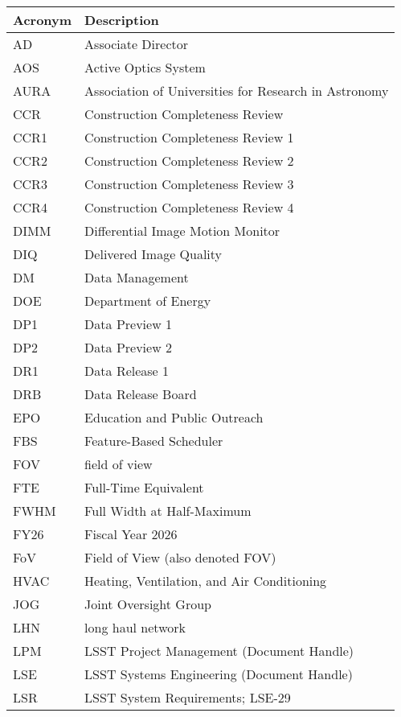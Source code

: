 \addtocounter{table}{-1}
\begin{longtable}{p{}p{}}\hline
\textbf{Acronym} & \textbf{Description}  \\\hline

AD & Associate Director \\\hline
AOS & Active Optics System \\\hline
AURA & Association of Universities for Research in Astronomy \\\hline
CCR & Construction Completeness Review \\\hline
CCR1 & Construction Completeness Review 1 \\\hline
CCR2 & Construction Completeness Review 2 \\\hline
CCR3 & Construction Completeness Review 3 \\\hline
CCR4 & Construction Completeness Review 4 \\\hline
DIMM & Differential Image Motion Monitor \\\hline
DIQ & Delivered Image Quality \\\hline
DM & Data Management \\\hline
DOE & Department of Energy \\\hline
DP1 & Data Preview 1 \\\hline
DP2 & Data Preview 2 \\\hline
DR1 & Data Release 1 \\\hline
DRB & Data Release Board \\\hline
EPO & Education and Public Outreach \\\hline
FBS & Feature-Based Scheduler \\\hline
FOV & field of view \\\hline
FTE & Full-Time Equivalent \\\hline
FWHM & Full Width at Half-Maximum \\\hline
FY26 & Fiscal Year 2026 \\\hline
FoV & Field of View (also denoted FOV) \\\hline
HVAC & Heating, Ventilation, and Air Conditioning \\\hline
JOG & Joint Oversight Group \\\hline
LHN & long haul network \\\hline
LPM & LSST Project Management (Document Handle) \\\hline
LSE & LSST Systems Engineering (Document Handle) \\\hline
LSR & LSST System Requirements; LSE-29 \\\hline

\end{longtable}
